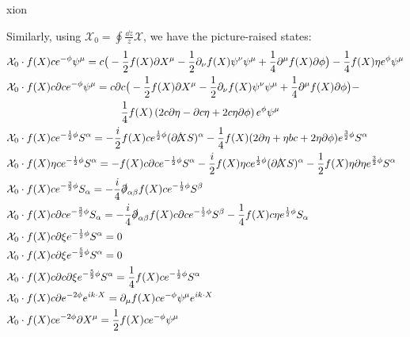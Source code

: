 xion\documentclass[12pt]{article}
\numberwithin{equation}{section}
\begin{document}
{\allowdisplaybreaks
Similarly, using $\mathcal{X}_0 = \oint \frac{\dd z}{z} \mathcal{X}$, we have the picture-raised states:
\begin{align}
\label{PCO1}
&{\cal X}_0 \cdot f(X) c e^{-\phi}\psi^\mu  = c\big(-\frac{1}{2} f(X) \partial X^\mu - \frac{1}{2} \partial_\nu f(X) \psi^\nu \psi^\mu + \frac{1}{4} \partial^\mu f(X) \partial \phi \big) - \frac{1}{4} f(X) \eta e^{\phi}\psi^\mu \\
\label{PCO2}
&{\cal X}_0 \cdot f(X) c \partial ce^{-\phi}\psi^\mu = c\partial c \big(-\frac{1}{2} f(X) \partial X^\mu - \frac{1}{2}\partial_\nu f(X) \psi^\nu \psi^\mu + \frac{1}{4} \partial^\mu f(X) \partial \phi \big) - \\ \nonumber
& \hspace{3.8cm}\frac{1}{4}f(X)\left(2 c\partial \eta - \partial c \eta + 2 c \eta \partial \phi \right)e^{\phi}\psi^\mu\\
\label{PCO3}
&{\cal X}_0 \cdot f(X) ce^{-\frac12\phi}S^\alpha =  -\frac{i}{2} f(X) ce^{\frac12\phi} (\slashed{\partial X} S)^\alpha - \frac{1}{4}f(X)(2 \partial \eta + \eta bc + 2 \eta \partial \phi)e^{\frac32\phi}S^\alpha \\
\label{PCO4}
&{\cal X}_0 \cdot f(X) \eta ce^{-\frac12\phi}S^\alpha=  -f(X) c\partial c e^{-\frac{1}{2}\phi}S^\alpha - \frac{i}{2} f(X) \eta ce^{\frac12\phi} (\slashed{\partial X} S)^\alpha - \frac{1}{2}f(X)\eta \partial \eta e^{\frac32\phi}S^\alpha \\
\label{PCO5}
&{\cal X}_0 \cdot f(X) ce^{-\frac32\phi}S_\alpha =  -\frac{i}{4} \slashed{\partial}_{\alpha \beta} f(X) c e^{-\frac12\phi} S^\beta  \\
\label{PCO6}
&{\cal X}_0 \cdot f(X) c \partial ce^{-\frac32\phi}S_\alpha = -\frac{i}{4} \slashed{\partial}_{\alpha \beta} f(X) c \partial ce^{-\frac12\phi} S^\beta -\frac{1}{4} f(X) c \eta e^{\frac12\phi}S_\alpha  \\
\label{PCO7}
&{\cal X}_0 \cdot f(X) c \partial \xi e^{-\frac12\phi}S^\alpha = 0 \\
\label{PCO8}
&{\cal X}_0 \cdot f(X) c \partial \xi e^{-\frac52 \phi}S^\alpha   = 0\\
\label{PCO9}
&{\cal X}_0 \cdot f(X) c \partial c \partial \xi e^{-\frac52 \phi}S^\alpha   = \frac{1}{4} f(X)c e^{-\frac12\phi}S^\alpha\\
\label{PCO10}
& {\cal{X}}_0 \cdot f(X) c \partial e^{-2\phi} e^{i k \cdot X} = \partial_\mu f(X) c e^{-\phi} \psi^\mu e^{i k \cdot X} \\
\label{PCO11}
& \mathcal{X}_0 \cdot f(X) c e^{-2\phi}\partial X^\mu = \frac{1}{2} f(X)c e^{-\phi}\psi^\mu \\

\end{align}}
\end{document}
